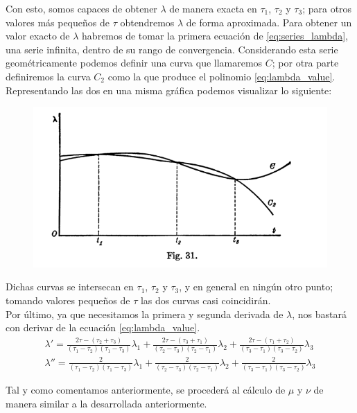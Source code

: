 \documentclass[11pt]{article}
\begin{document}
Con esto, somos capaces de obtener $\lambda$ de manera exacta en $\tau_1$, $\tau_2$ y $\tau_3$; para otros valores más pequeños de $\tau$ obtendremos $\lambda$ de forma aproximada. Para obtener un valor exacto de $\lambda$ habremos de tomar la primera ecuación de \ref{eq:series_lambda}, una serie infinita, dentro de su rango de convergencia. Considerando esta serie geométricamente podemos definir una curva que llamaremos $C$; por otra parte definiremos la curva $C_2$ como la que produce el polinomio \ref{eq:lambda_value}. Representando las dos en una misma gráfica podemos visualizar lo siguiente:
\begin{figure}[H]
\centering
\includegraphics[scale=0.5]{images/fig_31.png}
\end{figure}

Dichas curvas se intersecan en $\tau_1$, $\tau_2$ y $\tau_3$, y en general en ningún otro punto; tomando valores pequeños de $\tau$ las dos curvas casi coincidirán.\\

Por último, ya que necesitamos la primera y segunda derivada de $\lambda$, nos bastará con derivar de la ecuación \ref{eq:lambda_value}.
\begin{align*}
\lambda' = \frac{2\tau-(\tau_2+\tau_3)}{(\tau_1-\tau_2)(\tau_1-\tau_3)}\lambda_1
+\frac{2\tau-(\tau_3+\tau_1)}{(\tau_2-\tau_3)(\tau_2-\tau_1)}\lambda_2
+\frac{2\tau-(\tau_1+\tau_2)}{(\tau_3-\tau_1)(\tau_3-\tau_2)}\lambda_3\\
\lambda'' = \frac{2}{(\tau_1-\tau_2)(\tau_1-\tau_3)}\lambda_1
+\frac{2}{(\tau_2-\tau_3)(\tau_2-\tau_1)}\lambda_2
+\frac{2}{(\tau_3-\tau_1)(\tau_3-\tau_2)}\lambda_3
\end{align*}

Tal y como comentamos anteriormente, se procederá al cálculo de $\mu$ y $\nu$ de manera similar a la desarrollada anteriormente.
\end{document}

